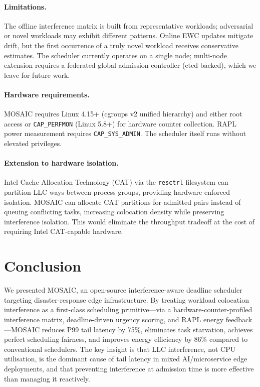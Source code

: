 \documentclass[sigconf,10pt]{acmart}
\newcommand{\sys}{MOSAIC\xspace}
\begin{document}
\paragraph{Limitations.}
The offline interference matrix is built from representative workloads;
adversarial or novel workloads may exhibit different patterns. Online EWC
updates mitigate drift, but the first occurrence of a truly novel workload
receives conservative estimates. The scheduler currently operates on a
single node; multi-node extension requires a federated global admission
controller (etcd-backed), which we leave for future work.

\paragraph{Hardware requirements.}
\sys requires Linux 4.15+ (cgroups v2 unified hierarchy) and either
root access or \texttt{CAP\_PERFMON} (Linux 5.8+) for hardware counter
collection. RAPL power measurement requires \texttt{CAP\_SYS\_ADMIN}.
The scheduler itself runs without elevated privileges.

\paragraph{Extension to hardware isolation.}
Intel Cache Allocation Technology (CAT) via the \texttt{resctrl} filesystem
can partition LLC ways between process groups, providing hardware-enforced
isolation. \sys can allocate CAT partitions for admitted pairs instead of
queuing conflicting tasks, increasing colocation density while preserving
interference isolation. This would eliminate the throughput tradeoff at the
cost of requiring Intel CAT-capable hardware.

\section{Conclusion}

We presented \sys, an open-source interference-aware deadline scheduler
targeting disaster-response edge infrastructure. By treating workload
colocation interference as a first-class scheduling primitive—via a
hardware-counter-profiled interference matrix, deadline-driven urgency
scoring, and RAPL energy feedback—\sys reduces P99 tail latency by 75\%,
eliminates task starvation, achieves perfect scheduling fairness, and
improves energy efficiency by 86\% compared to conventional schedulers.
The key insight is that LLC interference, not CPU utilisation, is the
dominant cause of tail latency in mixed AI/microservice edge deployments,
and that preventing interference at admission time is more effective than
managing it reactively.
\end{document}
